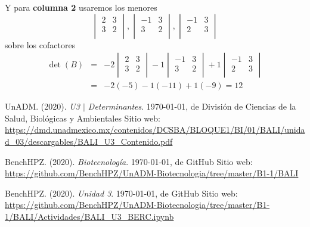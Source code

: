 \documentclass[12pt]{article}
\begin{document}
\begin{multicols}{2}
\begin{enumerate}[A.]
		Y para \textbf{columna 2} usaremos los menores
			$$\begin{vmatrix}
				 2 &  3 \\
				 3 &  2 \\
			\end{vmatrix},
			\begin{vmatrix}
				-1 &  3 \\
				 3 &  2 \\
			\end{vmatrix},
			\begin{vmatrix}
				-1 &  3 \\
				 2 &  3 \\
			\end{vmatrix}$$
		sobre los cofactores
			\begin{eqnarray*}
				\det(B) &=&
					- 2 \begin{vmatrix}
						 2 &  3 \\
						 3 &  2 \\
					\end{vmatrix} -
					1 \begin{vmatrix}
						-1 &  3 \\
						 3 &  2 \\
					\end{vmatrix} +
					1 \begin{vmatrix}
						-1 &  3 \\
						 2 &  3 \\
					\end{vmatrix} \\
					&=& - 2(-5) - 1(-11) + 1(-9) = 12
			\end{eqnarray*}
		
	\end{enumerate}
\end{multicols}



\newpage
\begin{thebibliography}{X}

	 UnADM. (2020). \textit{U3 $|$ Determinantes}. \today, de División de Ciencias de la Salud, Biológicas y Ambientales Sitio web: \url{https://dmd.unadmexico.mx/contenidos/DCSBA/BLOQUE1/BI/01/BALI/unidad_03/descargables/BALI_U3_Contenido.pdf}
	
	BenchHPZ. (2020). \textit{Biotecnolog\'ia}. \today, de GitHub Sitio web: \url{https://github.com/BenchHPZ/UnADM-Biotecnologia/tree/master/B1-1/BALI}
	
	 BenchHPZ. (2020). \textit{Unidad 3}. \today, de GitHub Sitio web: \url{https://github.com/BenchHPZ/UnADM-Biotecnologia/tree/master/B1-1/BALI/Actividades/BALI_U3_BERC.ipynb}
\end{thebibliography}
\end{document}
